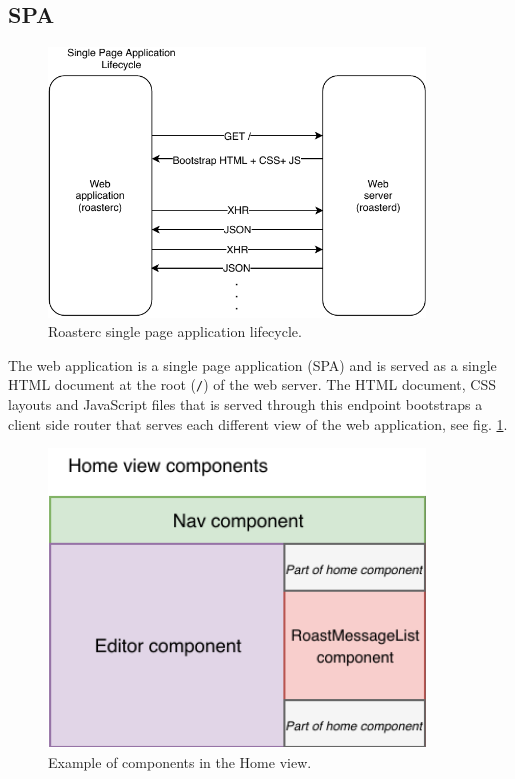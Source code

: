 \documentclass[12pt,a4paper]{report}
\begin{document}
\subsection{SPA}
\begin{figure}[H]
  \centering
  \includegraphics[width=10cm]{spa-lifecycle.pdf}
  \caption{Roasterc single page application lifecycle.}
  \label{fig:roasterc-lifecycle}
\end{figure}

The web application is a single page application (SPA) and is served as a single HTML document at the root (\texttt{/}) of the web server. The HTML document, CSS layouts and JavaScript files that is served through this endpoint bootstraps a client side router that serves each different view of the web application, see fig. \ref{fig:roasterc-lifecycle}. 

\begin{figure}[H]
  \centering
  \includegraphics[width=10cm]{home-view-components.pdf}
  \caption{Example of components in the Home view.}
  \label{fig:home-view-components}
\end{figure}
\end{document}

